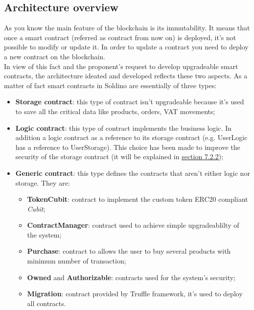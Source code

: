 \subsection{Architecture overview}
As you know the main feature of the blockchain is its immutability. It means that once a smart contract (referred as contract from now on) is 
deployed, it's not possible to modify or update it. In order to update a contract you need to deploy 
a new contract on the blockchain.\\
In view of this fact and the proponent's request to develop upgradeable smart contracts, the architecture ideated and developed reflects these two aspects. As a matter of fact smart contracts in Soldino
are essentially of three types:
\begin{itemize}
	\item\textbf{Storage contract}: this type of contract isn't upgradeable because it's used
		to save all the critical data like products, orders, VAT movements;
	\item\textbf{Logic contract}: this type of contract implements the business logic. In addition
	a logic contract as a reference to its storage contract (e.g. UserLogic has a reference to UserStorage). This choice has been made to improve the security of the storage contract (it will be explained in \hyperlink{st}{\underline{section 7.2.2}});
	\item\textbf{Generic contract}: this type defines the contracts that aren't either logic nor storage.
	They are:
	\begin{itemize}
		\item\textbf{TokenCubit}: contract to implement the custom token ERC20 compliant \textit{Cubit};
		\item\textbf{ContractManager}: contract used to achieve simple upgradeablilty of the system;
		\item\textbf{Purchase}: contract to allows the user to buy several products with minimum number of transaction;
		\item\textbf{Owned} and \textbf{Authorizable}: contracts used for the system's security;
		\item\textbf{Migration}: contract provided by Truffle framework, it's used to deploy all contracts. 
	\end{itemize}
\end{itemize}

